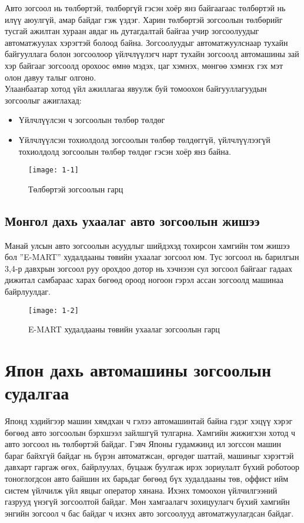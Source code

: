 Авто зогсоол нь төлбөртэй, төлбөргүй гэсэн хоёр янз байгаагаас төлбөртэй нь илүү аюулгүй, амар байдаг гэж үздэг. Харин төлбөртэй зогсоолын төлбөрийг тусгай ажилтан хураан авдаг нь дутагдалтай байгаа учир зогсоолуудыг автоматжуулах хэрэгтэй болоод байна. Зогсоолуудыг автоматжуулснаар тухайн байгууллага болон зогсоолоор үйлчлүүлэгч нарт тухайн зогсоолд автомашины зай хэр байгааг зогсоолд орохоос өмнө мэдэх, цаг хэмнэх, мөнгөө хэмнэх гэх мэт олон давуу талыг олгоно.\\
 
Улаанбаатар хотод үйл ажиллагаа явуулж буй томоохон байгууллагуудын зогсоолыг ажиглахад: 
\begin{itemize}
	\item Үйлчлүүлсэн ч зогсоолын төлбөр төлдөг
	\item Үйлчлүүлсэн тохиолдолд зогсоолын төлбөр төлдөггүй, үйлчлүүлээгүй тохиолдолд зогсоолын төлбөр төлдөг гэсэн хоёр янз байна.
\end{itemize}

\begin{figure}[!ht]
	\centering
	\texttt{[image: 1-1]}
	\caption{Төлбөртэй зогсоолын гарц}
	\label{fig:1-1}
\end{figure}
\subsection{Монгол дахь ухаалаг авто зогсоолын жишээ }
Манай улсын авто зогсоолын асуудлыг шийдэхэд тохирсон хамгийн том жишээ бол ''E-MART'' худалдааны төвийн ухаалаг зогсоол юм. Тус зогсоол нь барилгын 3,4-р давхрын зогсоол руу орохдоо дотор нь хэчнээн сул зогсоол байгааг гадаах дижитал самбараас харах бөгөөд ороод ногоон гэрэл ассан зогсоолд машинаа байрлуулдаг.
\begin{figure}[!ht]
	\centering
	\texttt{[image: 1-2]}
	\caption{E-MART худалдааны төвийн ухаалаг зогсоолын гарц}
	\label{fig:1-2}
\end{figure}
\section{Япон дахь автомашины зогсоолын судалгаа }
Японд хэдийгээр машин хямдхан ч гэлээ автомашинтай байна гэдэг хэцүү хэрэг бөгөөд авто зогсоолын бэрхшээл зайлшгүй тулгарна. Хамгийн жижигхэн хотод ч авто зогсоол нь төлбөртэй байдаг. Гэвч Японы гудамжинд ил зогссон машин бараг байхгүй байдаг нь бүрэн автоматжсан, өргөдөг шаттай, машиныг хэрэгтэй давхарт гаргаж өгөх, байрлуулах, буцааж буулгаж ирэх зориулалт бүхий роботоор тоноглогдсон авто байшин их барьдаг бөгөөд бүх худалдааны төв, оффист ийм систем үйлчилж үйл явцыг оператор хянана. Ихэнх томоохон үйлчилгээний газрууд үнэгүй зогсоолтой байдаг. Мөн хамгаалагч зохицуулагч бүхий хамгийн энгийн зогсоол ч бас байдаг ч ихэнх авто зогсоолууд автоматжуулагдсан байдаг.\\

